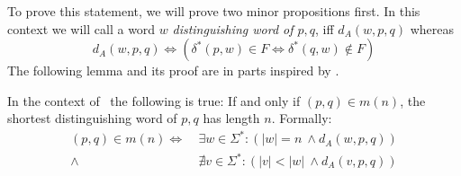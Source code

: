 To prove this statement, we will prove two minor propositions first. In this context we will call a word $w$ \emph{distinguishing word of $p,q$}, iff $d_A(w, p, q)$ whereas
\[
    d_A(w, p, q) \Leftrightarrow (\delta^*(p,w) \in F \Leftrightarrow \delta^*(q,w) \notin F)
\]
The following lemma and its proof are in parts inspired by \cite[ch.\ 4 p.\ 18]{MS18}.

\begin{lemma}\label{ch:3:semantics-of-m(n)}
    In the context of \CompDist\ the following is true: If and only if $(p,q)\in m(n)$, the shortest distinguishing word of $p,q$ has length $n$. Formally:
    \begin{align*}
        (p,q) \in m(n) \Longleftrightarrow\ &\exists w\in\Sigma^*\colon (|w| = n\ \land d_A(w, p, q))\\
        \land\ &\nexists v\in\Sigma^*\colon (|v| < |w|\ \land d_A(v, p, q))
    \end{align*}
\end{lemma}

